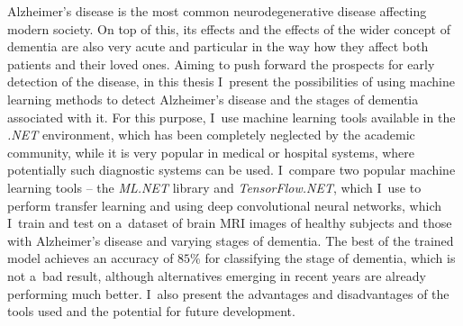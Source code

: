 \begin{abstract-en}

  Alzheimer's disease is the most common neurodegenerative disease affecting modern society.
  On top of this, its effects and the effects of the wider concept of dementia are also very acute and particular in the way how they affect both patients and their loved ones.
  Aiming to push forward the prospects for early detection of the disease, in this thesis I~present the possibilities of using machine learning methods to detect Alzheimer's disease and the stages of dementia associated with it.
  For this purpose, I~use machine learning tools available in the \emph{.NET} environment, which has been completely neglected by the academic community, while it is very popular in medical or hospital systems, where potentially such diagnostic systems can be used.
  I~compare two popular machine learning tools -- the \emph{ML.NET} library and \emph{TensorFlow.NET}, which I~use to perform transfer learning and using deep convolutional neural networks, which I~train and test on a~dataset of brain MRI images of healthy subjects and those with Alzheimer's disease and varying stages of dementia.
  The best of the trained model achieves an accuracy of $85\%$ for classifying the stage of dementia, which is not a~bad result, although alternatives emerging in recent years are already performing much better.
  I~also present the advantages and disadvantages of the tools used and the potential for future development.

\end{abstract-en}
